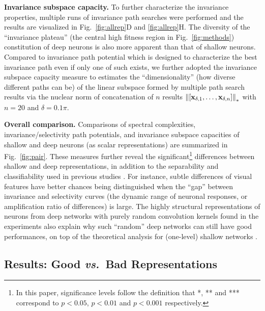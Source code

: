 \documentclass[10pt,twocolumn,letterpaper]{article}
\begin{document}
{\bf Invariance subspace capacity.} To further characterize the invariance properties, multiple runs of invariance path searches {were} performed and the results are visualized in Fig.~\ref{fig:allrep}D and \ref{fig:allrep}H.
The diversity of the ``invariance plateau'' (\eg the central high fitness region in Fig.~\ref{fig:methods}) constitution of deep neurons is also more apparent than that of shallow neurons.
Compared to invariance path potential which is designed to characterize the best invariance path even if only one of such exists, we further adopted the invariance subspace capacity measure to estimates the ``dimensionality'' (\ie how diverse different paths can be) of the linear subspace formed by multiple path search results via the nuclear norm of concatenation of $n$ results $\left\|\left[{\bf{x}}_{\delta,1},\dots,{\bf{x}}_{\delta,n}\right]\right\|_{*}$ with $n=20$ and $\delta=0.1\pi$.


\newcommand{\defstars}{In this paper, significance levels follow the definition that *, ** and *** correspond to $p<0.05$, $p<0.01$ and $p<0.001$ respectively.\label{fnote:defstars}}

{\bf Overall comparison.} Comparisons of spectral complexities, invariance/selectivity path potentials, and invariance subspace capacities of shallow and deep neurons (as scalar representations) are summarized in Fig.~\ref{fig:pair}.
These measures further reveal the significant\footnote{\defstars} differences between shallow and deep representations, in addition to the separability and classifiability used in previous studies \cite{donahue2014decaf, zeiler2014visualizing}.
For instance, subtle differences of visual features have better chances being distinguished when the ``gap'' between invariance and selectivity curves (\ie the dynamic range of neuronal responses, or amplification ratio of differences) is large. 
The highly structural representations of neurons from deep networks with purely random convolution kernels found in the experiments also explain why such ``random'' deep networks can still have good performances, on top of the theoretical analysis for (one-level) shallow networks \cite{saxe2011random}.


\subsection{Results: Good \textbf{\textit{vs.}}~Bad Representations}
\end{document}
